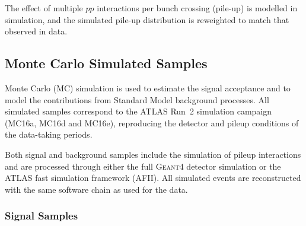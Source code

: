 The effect of multiple $pp$ interactions per bunch crossing (pile-up) is
modelled in simulation, and the simulated pile-up distribution is reweighted to match
that observed in data.

\subsection{Monte Carlo Simulated Samples}

Monte Carlo (MC) simulation is used to estimate the signal acceptance
and to model the contributions from Standard Model background processes.
All simulated samples correspond to the ATLAS Run~2 simulation campaign
(MC16a, MC16d and MC16e), reproducing the detector and pileup conditions
of the data-taking periods.

Both signal and background samples include the simulation of pileup
interactions and are processed through either the full \textsc{Geant4}
detector simulation or the ATLAS fast simulation framework (AFII).
All simulated events are reconstructed with the same software chain as
used for the data.

\subsubsection{Signal Samples}
\label{subsec:signal_samples}

